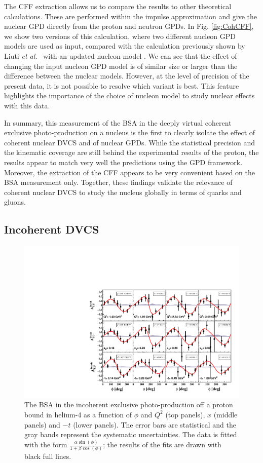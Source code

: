 \documentclass[aps,prc,preprint,superscriptaddress]{revtex4}
\begin{document}
The CFF extraction allows us to compare the results to other theoretical calculations.
These are performed within the impulse approximation \cite{Guzey:2003jh,Guzey:2008th} 
and give the nuclear GPD directly from the proton and neutron GPDs. In 
Fig. \ref{fig:CohCFF}, we show two versions of this calculation, where two different nucleon GPD
models are used as input, compared with the calculation previously shown by Liuti 
{\it et al.}~\cite{Liuti:2005gi} with an updated nucleon model \cite{GonzalezHernandez:2012jv}.
We can see that the effect of changing the input nucleon GPD model
is of similar size or larger than the difference between the nuclear 
models. However, at the level of precision of the present data,
it is not possible to resolve which variant is best. This feature highlights the 
importance of the choice of nucleon model to study nuclear effects with this data.

In summary, this measurement of the BSA in the deeply virtual coherent exclusive 
photo-production on a nucleus is the first to clearly isolate the effect of 
coherent nuclear DVCS and of nuclear GPDs. While the statistical precision and 
the kinematic coverage are still behind the experimental results of
the proton, the results appear to match very well the predictions using the GPD 
framework. Moreover, the extraction of the CFF appears to be very convenient based
on the BSA measurement only. Together, these findings  validate the relevance of
coherent nuclear DVCS to study the nucleus globally in terms of quarks and 
gluons. 

\subsection{Incoherent DVCS}

\begin{figure}[bp!]
\center
\includegraphics[width=15cm]{incoherent_ALU_phi.pdf}
	\caption{The BSA in the incoherent exclusive photo-production off a proton bound in
	helium-4 as a function of $\phi$ and $Q^2$ 
	(top panels), $x$ (middle panels) and $-t$ (lower panels). The error bars are  
	statistical and the gray bands represent the systematic uncertainties. The data is fitted with the 
	form $\frac{\alpha \sin(\phi)}{1+\beta \cos(\phi)}$; the results of the 
	fits are drawn with black full lines.}
\label{fig:InCohALUphi}
\end{figure}
\end{document}
